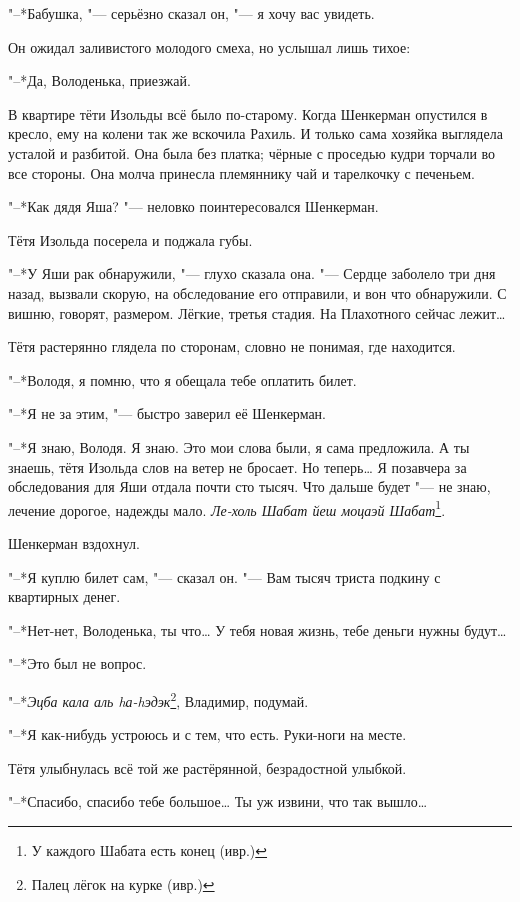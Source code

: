 "--*Бабушка, "--- серьёзно сказал он, "--- я хочу вас увидеть.

Он ожидал заливистого молодого смеха, но услышал лишь тихое:

"--*Да, Володенька, приезжай.

В квартире тёти Изольды всё было по-старому.
Когда Шенкерман опустился в кресло, ему на колени так же вскочила Рахиль.
И только сама хозяйка выглядела усталой и разбитой.
Она была без платка;
чёрные с проседью кудри торчали во все стороны.
Она молча принесла племяннику чай и тарелкочку с печеньем.

"--*Как дядя Яша? "--- неловко поинтересовался Шенкерман.

Тётя Изольда посерела и поджала губы.

"--*У Яши рак обнаружили, "--- глухо сказала она.
"--- Сердце заболело три дня назад, вызвали скорую, на обследование его отправили, и вон что обнаружили.
С вишню, говорят, размером.
Лёгкие, третья стадия.
На Плахотного сейчас лежит\ldots{}

Тётя растерянно глядела по сторонам, словно не понимая, где находится.

"--*Володя, я помню, что я обещала тебе оплатить билет.

"--*Я не за этим, "--- быстро заверил её Шенкерман.

"--*Я знаю, Володя.
Я знаю.
Это мои слова были, я сама предложила.
А ты знаешь, тётя Изольда слов на ветер не бросает.
Но теперь\ldots{}
Я позавчера за обследования для Яши отдала почти сто тысяч.
Что дальше будет "--- не знаю, лечение дорогое, надежды мало.
\textit{Ле-холь Шабат йеш моцаэй Шабат}\footnote{У каждого Шабата есть конец (ивр.)}.

Шенкерман вздохнул.

"--*Я куплю билет сам, "--- сказал он.
"--- Вам тысяч триста подкину с квартирных денег.

"--*Нет-нет, Володенька, ты что\ldots{}
У тебя новая жизнь, тебе деньги нужны будут\ldots{}

"--*Это был не вопрос.

"--*\textit{Эцба кала аль hа-hэдэк}\footnote{Палец лёгок на курке (ивр.)}, Владимир, подумай.

"--*Я как-нибудь устроюсь и с тем, что есть.
Руки-ноги на месте.

Тётя улыбнулась всё той же растёрянной, безрадостной улыбкой.

"--*Спасибо, спасибо тебе большое\ldots{}
Ты уж извини, что так вышло\ldots{}

